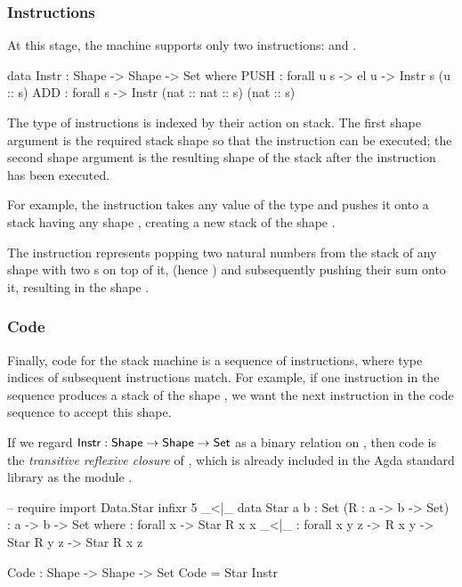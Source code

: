 \subsubsection{Instructions}

At this stage, the machine supports only two instructions: 
and .
\begin{code}
  data Instr : Shape -> Shape -> Set where
    PUSH : forall {u s} -> el u -> Instr s (u :: s)
    ADD : forall s -> Instr (nat :: nat :: s) (nat :: s)
\end{code}
The type of instructions is indexed by their action on stack. The first shape
argument is the required stack shape so that the instruction can be executed;
the second shape argument is the resulting shape of the stack after the
instruction has been executed.

For example, the instruction  takes any value of the type 
and pushes it onto a stack having any shape , creating a new
stack of the shape .

The instruction  represents popping two natural numbers from the
stack of any shape with two s on top of it, (hence
)
and subsequently pushing their sum onto it, resulting in the shape
.

\subsubsection{Code}

Finally, code for the stack machine is a sequence of instructions, where
type indices of subsequent instructions match. For example, if one instruction
in the sequence produces a stack of the shape ,
we want the next instruction in the code sequence to accept this shape.

If we regard
$\mathsf{Instr} : \mathsf{Shape} \to \mathsf{Shape} \to \mathsf{Set}$
as a binary relation on , then code is the \emph{transitive reflexive closure}
of , which is already included in the Agda standard library as the
module .

\begin{code}
  -- require import Data.Star
  infixr 5 _<|\_
  data Star {a b : Set} (R : a -> b -> Set) : a -> b -> Set where
    \nil : forall {x} -> Star R x x
    _<|\_ : forall {x y z} -> R x y -> Star R y z -> Star R x z

  Code : Shape -> Shape -> Set
  Code = Star Instr
\end{code}

